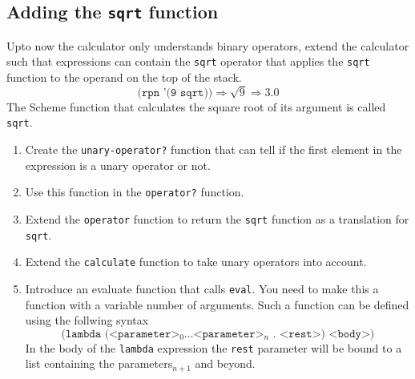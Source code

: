 \documentclass[12pt,a4paper,english,twoside]{article}
\begin{document}
\subsection{Adding the \texttt{sqrt} function}
Upto now the calculator only understands binary operators, extend the 
calculator such that expressions can contain the \texttt{sqrt} operator that 
applies the \texttt{sqrt} function to the operand on the top of the stack.  
\begin{equation*}
  \texttt{(rpn '(9 sqrt))} \Rightarrow \sqrt{9} \Rightarrow 3.0
\end{equation*}
The Scheme function that calculates the square root of its argument is called 
\texttt{sqrt}.
\begin{enumerate}
  \item Create the \texttt{unary-operator?} function that can tell if the 
    first element in the expression is a unary operator or not. 
  \item Use this function in the \texttt{operator?} function.
  \item Extend the \texttt{operator} function to return the \texttt{sqrt} function as a 
    translation for \texttt{sqrt}.
  \item Extend the \texttt{calculate} function to take unary operators into 
    account.
  \item Introduce an evaluate function that calls \texttt{eval}. You need to 
    make this a function with a variable number of arguments. Such a function 
    can be defined using the follwing syntax
    \begin{equation*}
      \texttt{(lambda (<parameter>$_{0} \dots $<parameter>$_{n}$ . <rest>) <body>)}
    \end{equation*}
    In the body of the \texttt{lambda} expression the \texttt{rest} parameter 
    will be bound to a list containing the parameters$_{n+1}$ and beyond.
\end{enumerate}

\end{document}

